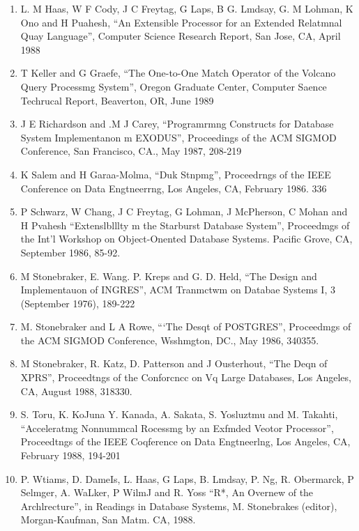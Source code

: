 \documentclass[a4paper,12pt,notitlepage,twoside,openright]{article}
\begin{document}
\begin{enumerate}
  \item
  L. M Haas, W F Cody, J C Freytag, G Laps, B
  G. Lmdsay, G. M Lohman, K Ono and H Puahesh,
  “An Extensible Processor for an Extended Relatmnal
  Quay Language”, Computer Science Research
  Report, San Jose, CA, April 1988
  \item
  T Keller and G Graefe, “The One-to-One Match
  Operator of the Volcano Query Processmg System”,
  Oregon Graduate Center, Computer Saence Techrucal
  Report, Beaverton, OR, June 1989
  \item
  J E Richardson and .M J Carey, “Programrmng
  Constructs for Database System Implementanon m
  EXODUS”, Proceedings of the ACM SIGMOD
  Conference, San Francisco, CA., May 1987, 208-219
  \item
  K Salem and H Garaa-Molma, “Duk Stnpmg”,
  Proceedrngs of the IEEE Conference on Data
  Engtneerrng, Los Angeles, CA, February 1986. 336
  \item
  P Schwarz, W Chang, J C Freytag, G Lohman, J
  McPherson, C Mohan and H Pvahesh “Extenslblllty
  m the Starburst Database System”, Proceedmgs of
  the Int’l Workshop on Object-Onented Database
  Systems. Pacific Grove, CA, September 1986, 85-92.
  \item
  M Stonebraker, E. Wang. P. Kreps and G. D. Held,
  “The Design and Implementauon of INGRES”, ACM
  Tranmctwm on Databae Systems I, 3 (September
  1976), 189-222
  \item
  M. Stonebraker and L A Rowe, “‘The Desqt of
  POSTGRES”, Proceedmgs of the ACM SIGMOD
  Conference, Wsshmgton, DC., May 1986, 340355.
  \item
  M Stonebraker, R. Katz, D. Patterson and J
  Ousterhout, “The Deqn of XPRS”, Proceedtngs of
  the Conforcncc on Vq Large Databases, Los
  Angeles, CA, August 1988, 318330.
  \item
  S. Toru, K. KoJuna Y. Kanada, A. Sakata, S.
  Yosluztmu and M. Takahti, “Acceleratmg
  Nonnummcal Rocessmg by an Exfmded Veotor
  Processor”, Proceedtngs of the IEEE Coqference on
  Data Engtneerlng, Los Angeles, CA, February 1988,
  194-201
  \item
  P. Wtiams, D. DameIs, L. Haas, G Laps, B.
  Lmdsay, P. Ng, R. Obermarck, P Selmger, A.
  WaLker, P WilmJ and R. Yoss “R*, An Overnew
  of the Archlrecture”, in Readings in Database
  Systems, M. Stonebrakes (editor), Morgan-Kaufman,
  San Matm. CA, 1988.
\end{enumerate}
\end{document}
